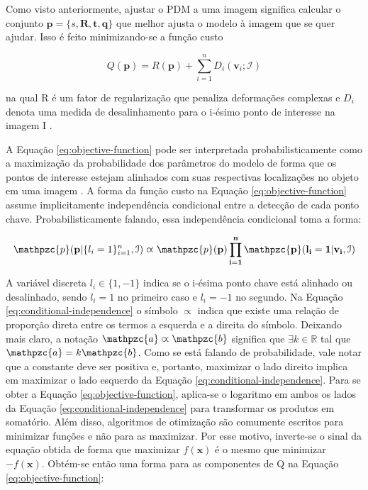 {Como visto anteriormente, ajustar o PDM a uma imagem significa calcular o
conjunto $\mathbf{p} = \{s, \bm{R}, \bm{t}, \bm{q}\}$ que melhor ajusta o modelo à imagem que se quer
ajudar. Isso é feito minimizando-se a função custo

\begin{equation}
Q(\mathbf{p}) = R(\mathbf{p}) + \sum_{i=1}^n D_i(\mathbf{v}_i; \mathcal{I})
\label{eq:objective-function}
\end{equation}

na qual R é um fator de regularização que penaliza deformações complexas e $D_i$
denota uma medida de desalinhamento para o i-ésimo ponto de interesse na imagem
I \cite{facetracker}.

A Equação \ref{eq:objective-function} pode ser interpretada probabilisticamente como a maximização
da probabilidade dos parâmetros do modelo de forma que os pontos de interesse
estejam alinhados com suas respectivas localizações no objeto em uma imagem \cite{facetracker}. A forma da função custo na Equação \ref{eq:objective-function} assume implicitamente independência condicional entre a detecção de cada ponto chave. Probabilisticamente falando, essa independência condicional toma a forma:

\begin{equation}
\label{eq:conditional-independence}
\mathpzc{p}(\mathbf{p} | \{l_i = 1\}_{i=1}^n, \mathcal{I}) \varpropto \mathpzc{p}(\bf{p}) \prod_{i=1}^n \mathpzc{p}(l_i = 1 | \mathbf{v}_i, \mathcal{I})
\end{equation}

A variável discreta $l_i \in \{1, -1\}$ indica se o i-ésima ponto chave está alinhado ou desalinhado, sendo $l_i=1$ no primeiro caso e $l_i=-1$ no segundo. Na Equação \ref{eq:conditional-independence} o símbolo $\varpropto$ indica que existe uma relação de proporção direta entre os termos a esquerda e a direita do símbolo. Deixando mais claro, a notação $\mathpzc{a} \varpropto \mathpzc{b}$ significa que $\exists k \in \mathbb{R}$ tal que $\mathpzc{a} = k \mathpzc{b}$. Como se está falando de probabilidade, vale notar que a constante
deve ser positiva e, portanto, maximizar o lado direito implica em maximizar o
lado esquerdo da Equação \ref{eq:conditional-independence}.  Para se obter a Equação \ref{eq:objective-function}, aplica-se
o logaritmo em ambos os lados da Equação \ref{eq:conditional-independence} para transformar os produtos em
somatório. Além disso, algoritmos de otimização são comumente escritos para
minimizar funções e não para as maximizar. Por esse motivo, inverte-se o sinal
da equação obtida de forma que maximizar $f(\mathbf{x})$ é o mesmo que minimizar
$-f(\mathbf{x})$. Obtém-se então uma forma para as componentes de Q na Equação \ref{eq:objective-function}:

}
